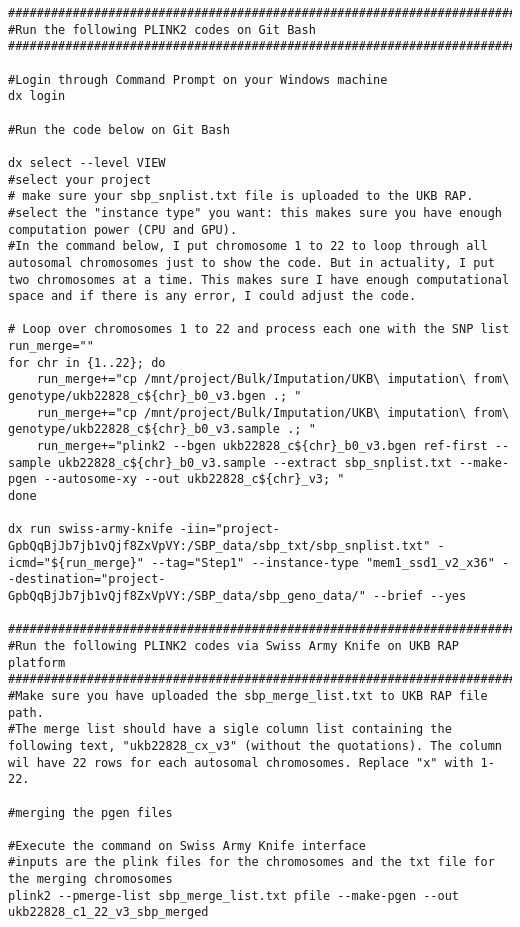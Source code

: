 \documentclass[11pt]{article}
\begin{document}
\begin{lstlisting}[style=BashStyle]
#########################################################################
#Run the following PLINK2 codes on Git Bash 
#########################################################################

#Login through Command Prompt on your Windows machine 
dx login

#Run the code below on Git Bash
 
dx select --level VIEW 
#select your project
# make sure your sbp_snplist.txt file is uploaded to the UKB RAP. 
#select the "instance type" you want: this makes sure you have enough computation power (CPU and GPU). 
#In the command below, I put chromosome 1 to 22 to loop through all autosomal chromosomes just to show the code. But in actuality, I put two chromosomes at a time. This makes sure I have enough computational space and if there is any error, I could adjust the code. 

# Loop over chromosomes 1 to 22 and process each one with the SNP list
run_merge=""
for chr in {1..22}; do
    run_merge+="cp /mnt/project/Bulk/Imputation/UKB\ imputation\ from\ genotype/ukb22828_c${chr}_b0_v3.bgen .; "
    run_merge+="cp /mnt/project/Bulk/Imputation/UKB\ imputation\ from\ genotype/ukb22828_c${chr}_b0_v3.sample .; "
    run_merge+="plink2 --bgen ukb22828_c${chr}_b0_v3.bgen ref-first --sample ukb22828_c${chr}_b0_v3.sample --extract sbp_snplist.txt --make-pgen --autosome-xy --out ukb22828_c${chr}_v3; "
done

dx run swiss-army-knife -iin="project-GpbQqBjJb7jb1vQjf8ZxVpVY:/SBP_data/sbp_txt/sbp_snplist.txt" -icmd="${run_merge}" --tag="Step1" --instance-type "mem1_ssd1_v2_x36" --destination="project-GpbQqBjJb7jb1vQjf8ZxVpVY:/SBP_data/sbp_geno_data/" --brief --yes

#########################################################################
#Run the following PLINK2 codes via Swiss Army Knife on UKB RAP platform 
#########################################################################
#Make sure you have uploaded the sbp_merge_list.txt to UKB RAP file path. 
#The merge list should have a sigle column list containing the following text, "ukb22828_cx_v3" (without the quotations). The column wil have 22 rows for each autosomal chromosomes. Replace "x" with 1-22. 

#merging the pgen files

#Execute the command on Swiss Army Knife interface 
#inputs are the plink files for the chromosomes and the txt file for the merging chromosomes 
plink2 --pmerge-list sbp_merge_list.txt pfile --make-pgen --out ukb22828_c1_22_v3_sbp_merged


\end{lstlisting}
\end{document}
